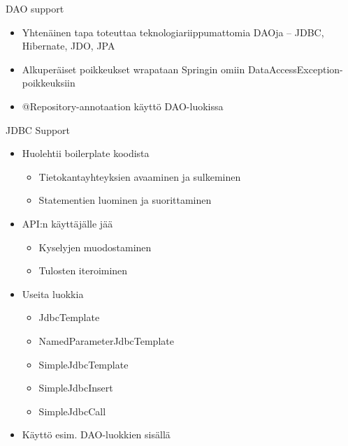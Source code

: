 \documentclass[hyperref={pdfauthor=\AUTHOR},14pt]{beamer}
\begin{document}
\begin{frame}[t, fragile]{DAO support}
\begin{itemize}
\item Yhtenäinen tapa toteuttaa teknologiariippumattomia DAOja
-- JDBC, Hibernate, JDO, JPA
\item Alkuperäiset poikkeukset wrapataan Springin omiin DataAccessException-poikkeuksiin
\item @Repository-annotaation käyttö DAO-luokissa

\end{itemize}
\end{frame}

\begin{frame}[t, fragile]{JDBC Support}
\begin{itemize}
\item Huolehtii boilerplate koodista
\begin{itemize}
\item Tietokantayhteyksien avaaminen ja sulkeminen
\item Statementien luominen ja suorittaminen
\end{itemize}
\item API:n käyttäjälle jää 
\begin{itemize}
\item Kyselyjen muodostaminen
\item Tulosten iteroiminen
\end{itemize}
\item Useita luokkia
\begin{itemize}
\item JdbcTemplate
\item NamedParameterJdbcTemplate
\item SimpleJdbcTemplate
\item SimpleJdbcInsert
\item SimpleJdbcCall
\end{itemize}
\item Käyttö esim. DAO-luokkien sisällä
\end{itemize}
\end{frame}
\end{document}
